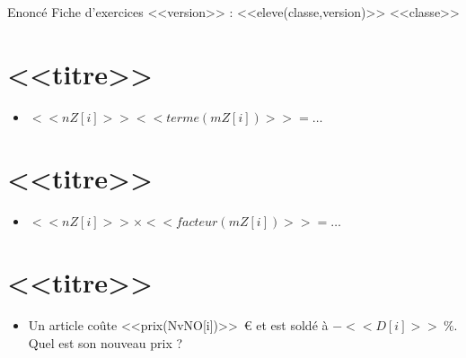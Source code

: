 {Enoncé} \hfill {\huge Fiche d'exercices \no <<version>> : <<eleve(classe,version)>>} \hfill {<<classe>>}

\section{<<titre>>}
\begin{itemize}

  \item $<<nZ[i]>> <<terme(mZ[i])>>=\ldots$
\end{itemize}



\section{<<titre>>}
\begin{itemize}

  \item $<<nZ[i]>>\times<<facteur(mZ[i])>>=\ldots$
\end{itemize}


\section{<<titre>>}
\begin{itemize}

  \item Un article coûte <<prix(NvNO[i])>>~€ et est soldé à $-<<D[i]>>~\%$. Quel est son nouveau prix ?
\end{itemize}
